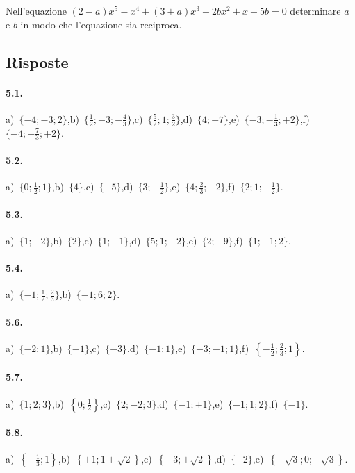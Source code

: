 \begin{esercizio}[\Ast]
 \label{ese:5.61}
Nell'equazione $(2-a)x^5-x^4+(3+a)x^3+2bx^2+x+5b=0$ determinare $a$ e $b$ in modo che l'equazione sia reciproca.
\end{esercizio}

\subsection{Risposte}
\paragraph{5.1.} a)~$\{-4;-3;2\}$,\quad b)~$\{\frac 1 2;-3;-\frac 4 3\}$,\quad c)~$\{\frac 5 2;1;\frac 3 2\}$,\quad d)~$\{4;-7\}$,\quad e)~$\{-3;-\frac 1 3;+2\}$,\quad f)~$\{-4;+\frac 7 3;+2\}$.

\paragraph{5.2.} a)~$\{0;\frac 1 2;1\}$,\quad b)~$\{4\}$,\quad c)~$\{-5\}$,\quad d)~$\{3;-\frac 1 2\}$,\quad e)~$\{4;\frac 2 3;-2\}$,\quad f)~$\{2;1;-\frac 1 2\}$.

\paragraph{5.3.} a)~$\{1;-2\}$,\quad b)~$\{2\}$,\quad c)~$\{1;-1\}$,\quad d)~$\{5;1;-2\}$,\quad e)~$\{2;-9\}$,\quad f)~$\{1;-1;2\}$.

\paragraph{5.4.} a)~$\{-1;\frac 1 2;\frac 2 3\}$,\quad b)~$\{-1;6;2\}$.

\paragraph{5.6.} a)~$\{-2;1\}$,\quad b)~$\{-1\}$,\quad c)~$\{-3\}$,\quad d)~$\{-1;1\}$,\quad e)~$\{-3;-1;1\}$,\quad f)~$\left\{-\frac1 2;\frac 2 3;1\right\}$.

\paragraph{5.7.} a)~$\{1;2;3\}$,\quad b)~$\left\{0;\frac1 2\right\}$,\quad c)~$\{2;-2;3\}$,\quad d)~$\{-1;+1\}$,\quad e)~$\{-1;1;2\}$,\quad f)~$\{-1\}$.

\paragraph{5.8.} a)~$\left\{-\frac 1 3;1\right\}$,\quad b)~$\left\{\pm 1;1\pm \sqrt 2\right\}$,\quad c)~$\left\{-3;\pm \sqrt 2\right\}$,\quad d)~$\{-2\}$,\quad e)~$\left\{-\sqrt 3;0;+\sqrt 3\right\}$.

